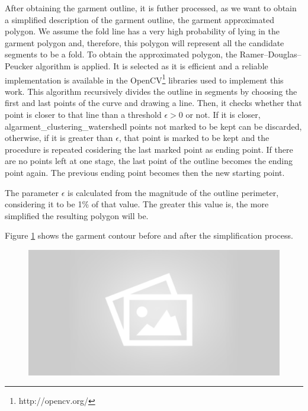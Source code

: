 After obtaining the garment outline, it is futher processed, as we want to obtain a simplified description of the garment outline, the garment approximated polygon. We assume the fold line has a very high probability of lying in the garment polygon and, therefore, this polygon will represent all the candidate segments to be a fold. To obtain the approximated polygon, the Ramer–Douglas–Peucker algorithm  is applied. It is selected as it is efficient and a reliable implementation is available in the OpenCV\footnote{http://opencv.org/} libraries used to implement this work. This algorithm recursively divides the outline in segments by choosing the first and last points of the curve and drawing a line. Then, it checks whether that point is closer to that line than a threshold $\epsilon > 0$ or not. If it is closer, algarment_clustering_watershedl points not marked to be kept can be discarded, otherwise, if it is greater than $\epsilon$, that point is marked to be kept and the procedure is repeated cosidering the last marked point as ending point. If there are no points left at one stage, the last point of the outline becomes the ending point again. The previous ending point becomes then the new starting point.

The parameter $\epsilon$ is calculated from the magnitude of the outline perimeter, considering it to be 1\% of that value. The greater this value is, the more simplified the resulting polygon will be.

Figure \ref{fig:contour_and_simplified_contour} shows the garment contour before and after the simplification process.

\begin{figure}[thpb]
    \centering
    \includegraphics[width=0.9
    \textwidth]{figures/placeholder2.png}
    \caption{}
    \label{fig:contour_and_simplified_contour}
\end{figure}
